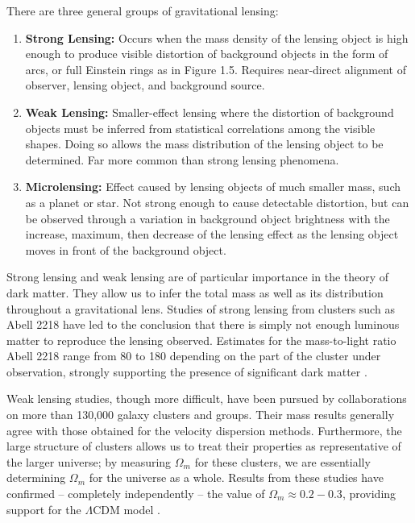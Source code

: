 \documentclass{report}
\begin{document}
There are three general groups of gravitational lensing:

\begin{enumerate}
\item \textbf{Strong Lensing:} Occurs when the mass density of the lensing object is high enough to produce visible distortion of background objects in the form of arcs, or full Einstein rings as in Figure 1.5. Requires near-direct alignment of observer, lensing object, and background source.
\item \textbf{Weak Lensing:} Smaller-effect lensing where the distortion of background objects must be inferred from statistical correlations among the visible shapes. Doing so allows the mass distribution of the lensing object to be determined. Far more common than strong lensing phenomena.
\item \textbf{Microlensing:} Effect caused by lensing objects of much smaller mass, such as a planet or star. Not strong enough to cause detectable distortion, but can be observed through a variation in background object brightness with the increase, maximum, then decrease of the lensing effect as the lensing object moves in front of the background object. %
\end{enumerate}

Strong lensing and weak lensing are of particular importance in the theory of dark matter. They allow us to infer the total mass as well as its distribution throughout a gravitational lens. Studies of strong lensing from clusters such as Abell 2218 have led to the conclusion that there is simply not enough luminous matter to reproduce the lensing observed. Estimates for the mass-to-light ratio Abell 2218 range from 80 to 180 depending on the part of the cluster under observation, strongly supporting the presence of significant dark matter \cite{Kneib1995,Kneib1996}.

Weak lensing studies, though more difficult, have been pursued by collaborations \cite{Sheldon2009} on more than 130,000 galaxy clusters and groups. Their mass results generally agree with those obtained for the velocity dispersion methods. Furthermore, the large structure of clusters allows us to treat their properties as representative of the larger universe; by measuring $\Omega_{m}$ for these clusters, we are essentially determining $\Omega_{m}$ for the universe as a whole. Results from these studies have confirmed -- completely independently -- the value of $\Omega_{m} \approx 0.2 - 0.3$, providing support for the $\Lambda$CDM model \cite{Sheldon2009}.
\end{document}

